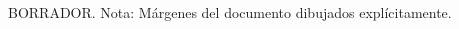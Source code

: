 \begin{titlepage}
    \vspace*{\fill}
    \begin{center}
        {\crest}\\[1.3cm]
        {\Large \gradua}\\
        {\espezialitatea}\\[1.5cm]

        {\large {\gapizenburua}}\\[0.2cm]
        \HRule \\[0.5cm]

        {
        \LARGE
        \begin{spacing}{0.5}
        \textbf{\izenburua}
        \end{spacing}
        }
        \vspace{0.5cm}
        \HRule \\[2.0cm]

        { \egileatestua \\}
        {\Large \textsl{\egilea}\\}
        \vspace{1.0cm}

        {\large \textsf{\urtea}}
        \begin{tcolorbox}[breakable]
            BORRADOR. Nota: Márgenes del documento dibujados explícitamente.
        \end{tcolorbox}
    \end{center}
    \vspace*{\fill}
\end{titlepage}

\cleardoublepage

